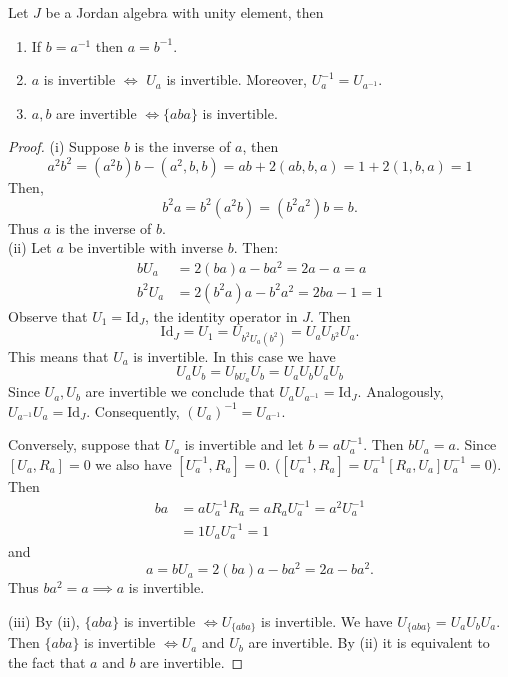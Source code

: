 \documentclass{article}
\begin{document}
\begin{lemma}  
Let $J$ be a Jordan algebra with unity element, then  
\begin{enumerate} 
    \item If $b = a^{-1}$ then $a = b^{-1}$.  
    \item $a$ is invertible $\iff$ $U_a$ is invertible. Moreover, $U_a^{-1} = U_{a^{-1}}$.  
    \item $a, b$ are invertible $\iff \{aba\}$ is invertible.  
\end{enumerate}  
\end{lemma} 

\begin{proof}  
\noindent(i) Suppose $b$ is the inverse of $a$, then  
\[ a^2b^2 = (a^2b)b - (a^2,b,b) = ab + 2(ab,b,a) = 1 + 2(1,b,a) = 1 \]  
Then,  
\[ b^2a = b^2(a^2b) = (b^2a^2)b = b. \]  
Thus $a$ is the inverse of $b$. \\
(ii) Let $a$ be invertible with inverse $b$. Then:  
\begin{align*}  
      bU_a &= 2(ba)a - ba^2 = 2a - a = a \\
      b^2U_a &= 2(b^2a)a - b^2a^2 = 2ba - 1 = 1 
\end{align*}  
Observe that $U_1 = \mathrm{Id}_{J}$, the identity operator in $J$. Then  
\[ \mathrm{Id}_{J} = U_1 = U_{b^2U_a(b^2)} = U_a U_{b^2} U_a. \]  
This means that $U_a$ is invertible.  
In this case we have  
\[ U_a U_b = U_{b U_a} U_b = U_a U_b U_a U_b \]  
Since $U_a, U_b$ are invertible we conclude that $U_a U_{a^{-1}} = \mathrm{Id}_{J}$. Analogously, $U_{a^{-1}} U_a = \mathrm{Id}_{J}$.  
Consequently, $(U_a)^{-1} = U_{a^{-1}}$.   

Conversely, suppose that $U_a$ is invertible and let $b = a U_a^{-1}$. Then $b U_a = a$.  
Since $[U_a, R_a]=0$ we also have $[U_a^{-1}, R_a]=0$. ($ [U_a^{-1}, R_a]=U_a^{-1}[R_a, U_a] U_a^{-1}=0$). Then  
\begin{align*}  
    ba &= a U_a^{-1} R_a = a R_a U_a^{-1} = a^2 U_a^{-1} \\
       &= 1 U_a U_a^{-1} = 1  
\end{align*}  
and  
\[ a = b U_a = 2(ba)a - ba^2 = 2a - ba^2. \]  
Thus $ba^2=a \implies a$ is invertible.  

(iii) By (ii), $\{aba\}$ is invertible $\iff U_{\{aba\}}$ is invertible. We have $U_{\{aba\}} = U_a U_b U_a$. Then $\{aba\}$ is invertible $\iff U_a$ and $U_b$ are invertible. By (ii) it is equivalent to the fact that $a$ and $b$ are invertible.  
\end{proof} 
\end{document}
